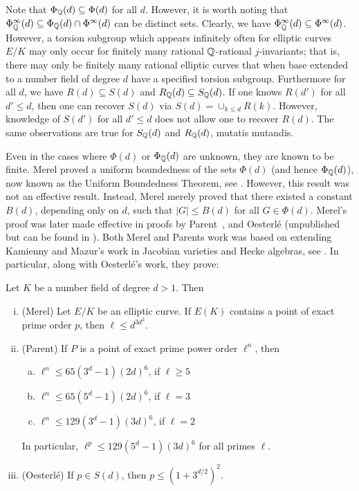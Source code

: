 Note that $\Phi_{\mathbb{Q}}(d) \subseteq \Phi(d)$ for all $d$. However, it is worth noting that $\Phi^\infty_{\mathbb{Q}}(d) \subseteq \Phi_{\mathbb{Q}}(d) \cap \Phi^\infty(d)$ can be distinct sets. Clearly, we have $\Phi_{\mathbb{Q}}^\infty(d) \subseteq \Phi^\infty(d)$. However, a torsion subgroup which appears infinitely often for elliptic curves $E/K$ may only occur for finitely many rational $\mathbb{Q}$-rational $j$-invariants; that is, there may only be finitely many rational elliptic curves that when base extended to a number field of degree $d$ have a specified torsion subgroup. Furthermore for all $d$, we have $R(d) \subseteq S(d)$ and $R_{\mathbb{Q}}(d) \subseteq S_{\mathbb{Q}}(d)$. If one knows $R(d')$ for all $d' \leq d$, then one can recover $S(d)$ via $S(d)= \cup_{k \leq d} R(k)$. However, knowledge of $S(d')$ for all $d' \leq d$ does not allow one to recover $R(d)$. The same observations are true for $S_{\mathbb{Q}}(d)$ and $R_{\mathbb{Q}}(d)$, mutatis mutandis. 


Even in the cases where $\Phi(d)$ or $\Phi_{\mathbb{Q}}(d)$ are unknown, they are known to be finite. Merel proved a uniform boundedness of the sets $\Phi(d)$ (and hence $\Phi_{\mathbb{Q}}(d)$), now known as the Uniform Boundedness Theorem, see \cite{merel96}. However, this result was not an effective result. Instead, Merel merely proved that there existed a constant $B(d)$, depending only on $d$, such that $|G| \leq B(d)$ for all $G \in \Phi(d)$. Merel's proof was later made effective in proofs by Parent~\cite{parent99}, and Oesterl\'e (unpublished but can be found in \cite{unpub}). Both Merel and Parents work was based on extending Kamienny and Mazur's work in Jacobian varieties and Hecke algebras, see \cite{edixhoven94}. In particular, along with Oesterl\'e's work, they prove:


\begin{thm} \label{thm:boundedness}
Let $K$ be a number field of degree $d > 1$. Then
	\begin{enumerate}[(i)]
	\item (Merel) Let $E/K$ be an elliptic curve. If $E(K)$ contains a point of exact prime order $p$, then $\ell \leq d^{3d^2}$.
	\item (Parent) If $P$ is a point of exact prime power order $\ell^n$, then
		\begin{enumerate}[(a)]
		\item $\ell^n \leq 65(3^d - 1)(2d)^6$, if $\ell \geq 5$
		\item $\ell^n \leq 65(5^d - 1)(2d)^6$, if $\ell= 3$
		\item $\ell^n \leq 129(3^d - 1)(3d)^6$, if $\ell= 2$
		\end{enumerate}
	In particular, $\ell^p \leq 129(5^d - 1)(3d)^6$ for all primes $\ell$. 
	\item (Oesterl\'e) If $p \in S(d)$, then $p \leq (1 + 3^{d/2})^2$. 
	\end{enumerate}
\end{thm}


